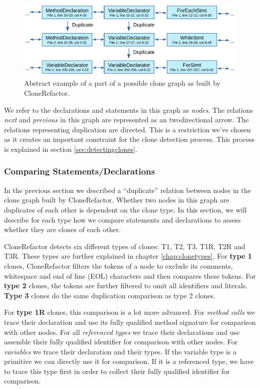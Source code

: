 \begin{figure}[H]
  \centering
  \includegraphics[width=1\columnwidth]{img/CodeGraph2}
  \caption{Abstract example of a part of a possible clone graph as built by CloneRefactor.}
  \label{fig:clonegraphsimple}
\end{figure}

We refer to the declarations and statements in this graph as \textit{nodes}. The relations \textit{next} and \textit{previous} in this graph are represented as an twodirectional arrow. The relations representing duplication are directed. This is a restriction we've chosen as it creates an important constraint for the clone detection process. This process is explained in section \ref{sec:detectingclones}.

\subsubsection{Comparing Statements/Declarations} \label{sec:comparingstuff}
In the previous section we described a ``duplicate'' relation between nodes in the clone graph built by CloneRefactor. Whether two nodes in this graph are duplicates of each other is dependent on the clone type. In this section, we will describe for each type how we compare statements and declarations to assess whether they are clones of each other.

CloneRefactor detects six different types of clones: T1, T2, T3, T1R, T2R and T3R. These types are further explained in chapter \ref{chap:clonetypes}. For \textbf{type 1} clones, CloneRefactor filters the tokens of a node to exclude its comments, whitespace and end of line (EOL) characters and then compares these tokens. For \textbf{type 2} clones, the tokens are further filtered to omit all identifiers and literals. \textbf{Type 3} clones do the same duplication comparison as type 2 clones.

For \textbf{type 1R} clones, this comparison is a lot more advanced. For \textit{method calls} we trace their declaration and use its fully qualified method signature for comparison with other nodes. For all \textit{referenced types} we trace their declarations and use assemble their fully qualified identifier for comparison with other nodes. For \textit{variables} we trace their declaration and their types. If the variable type is a primitive we can directly use it for comparison. If it is a referenced type, we have to trace this type first in order to collect their fully qualified identifier for comparison.

